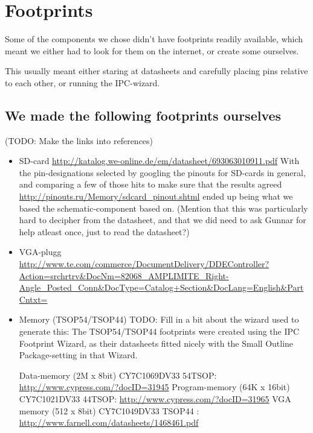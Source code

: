 \section {Footprints}
Some of the components we chose didn't have footprints readily available,
which meant we either had to look for them on the internet, or create some
ourselves.

This usually meant either staring at datasheets and carefully placing pins relative
to each other, or running the IPC-wizard.

\subsection {We made the following footprints ourselves}
(TODO: Make the links into references)
\begin {itemize}
\item SD-card \url{http://katalog.we-online.de/em/datasheet/693063010911.pdf}
With the pin-designations selected by googling the pinouts for SD-cards in general, and
comparing a few of those hits to make sure that the results agreed \url{http://pinouts.ru/Memory/sdcard_pinout.shtml}
ended up being what we based the schematic-component based on. (Mention that this was
particularly hard to decipher from the datasheet, and that we did need to ask Gunnar for
help atleast once, just to read the datasheet?)
\item VGA-plugg \url{http://www.te.com/commerce/DocumentDelivery/DDEController?Action=srchrtrv&DocNm=82068_AMPLIMITE_Right-Angle_Posted_Conn&DocType=Catalog+Section&DocLang=English&PartCntxt=}
\item Memory (TSOP54/TSOP44)
TODO: Fill in a bit about the wizard used to generate this:
The TSOP54/TSOP44 footprints were created using the IPC Footprint Wizard, as their datasheets fitted
nicely with the Small Outline Package-setting in that Wizard.

Data-memory (2M x 8bit) CY7C1069DV33  54TSOP: \url{http://www.cypress.com/?docID=31945}
Program-memory (64K x 16bit) CY7C1021DV33  44TSOP: \url{http://www.cypress.com/?docID=31965}
VGA memory (512 x 8bit) CY7C1049DV33 TSOP44 : \url{http://www.farnell.com/datasheets/1468461.pdf}
\end {itemize}

